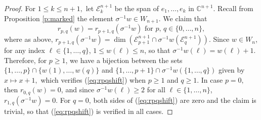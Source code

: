\documentclass[12pt]{amsart}
\numberwithin{equation}{section}
\newcommand{\Wn}{{W}_n}
\newcommand{\cW}{{ W}}
\newcommand{\C}{\mbox{${\mathbb C}$}}
\begin{document}
\begin{proof}
 For $1\le k \le n+1,$ let ${\mathcal{E}}^{n+1}_{k}$ be the span of $e_1, \dots, e_k$ in $\C^{n+1}.$  Recall from Proposition \ref{p:marked} the element $\sigma^{-1} w \in {\cW}_{n+1}.$  We claim that
\begin{equation}\label{eq:rpqshift}
r_{p,q}(w)=r_{p+1, q}(\sigma^{-1} w)\mbox{ for } p, \, q\in\{0,\dots, n\},
\end{equation}
where as above, $r_{p+1, q}(\sigma^{-1}w)=\dim(\mathcal{E}^{n+1}_{p+1}\cap \sigma^{-1}w(\mathcal{E}^{n+1}_{q})).$  Since $w\in \Wn$, for any index $\ell\in\{1,\dots, q\}$, 
$1\leq w(\ell)\leq n$, so that $\sigma^{-1}w(\ell)=w(\ell)+1$.  
Therefore, for $p\geq 1$, we have a bijection between the sets $\{1,\dots, p\}\cap \{w(1),\dots, w(q)\}$ and $\{1,\dots, p+1\}\cap \sigma^{-1}w (\{1,\dots, q\})$ given by $x\mapsto x+1,$ which verifies (\ref{eq:rpqshift}) when $p \ge 1$ and $q \ge 1.$  In case $p=0,$ then $r_{0,q}(w)=0$, and since $\sigma^{-1}w(\ell)\geq 2$ for all $\ell\in\{1,\dots, n\}$, $r_{1,q}(\sigma^{-1} w)=0.$  For $q=0$, both sides of (\ref{eq:rpqshift}) are zero and the claim is trivial, so that (\ref{eq:rpqshift}) is verified in all cases.   


\end{proof}
\end{document}
